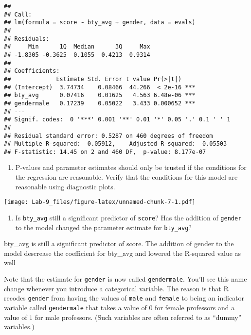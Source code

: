 \documentclass[
]{article}
\newenvironment{Shaded}{\begin{snugshade}}{\end{snugshade}}
\newcommand{\FunctionTok}[1]{\textcolor[rgb]{0.00,0.00,0.00}{#1}}
\newcommand{\NormalTok}[1]{#1}
\newcommand{\SpecialCharTok}[1]{\textcolor[rgb]{0.00,0.00,0.00}{#1}}
\providecommand{\tightlist}{%
  \setlength{\itemsep}{0pt}\setlength{\parskip}{0pt}}
\begin{document}
\begin{verbatim}
## 
## Call:
## lm(formula = score ~ bty_avg + gender, data = evals)
## 
## Residuals:
##     Min      1Q  Median      3Q     Max 
## -1.8305 -0.3625  0.1055  0.4213  0.9314 
## 
## Coefficients:
##             Estimate Std. Error t value Pr(>|t|)    
## (Intercept)  3.74734    0.08466  44.266  < 2e-16 ***
## bty_avg      0.07416    0.01625   4.563 6.48e-06 ***
## gendermale   0.17239    0.05022   3.433 0.000652 ***
## ---
## Signif. codes:  0 '***' 0.001 '**' 0.01 '*' 0.05 '.' 0.1 ' ' 1
## 
## Residual standard error: 0.5287 on 460 degrees of freedom
## Multiple R-squared:  0.05912,    Adjusted R-squared:  0.05503 
## F-statistic: 14.45 on 2 and 460 DF,  p-value: 8.177e-07
\end{verbatim}

\begin{enumerate}
\def\labelenumi{\arabic{enumi}.}
\setcounter{enumi}{6}
\tightlist
\item
  P-values and parameter estimates should only be trusted if the
  conditions for the regression are reasonable. Verify that the
  conditions for this model are reasonable using diagnostic plots.
\end{enumerate}

\begin{Shaded}
\end{Shaded}

\texttt{[image: Lab-9\_files/figure-latex/unnamed-chunk-7-1.pdf]}

\begin{enumerate}
\def\labelenumi{\arabic{enumi}.}
\setcounter{enumi}{7}
\tightlist
\item
  Is \texttt{bty\_avg} still a significant predictor of \texttt{score}?
  Has the addition of \texttt{gender} to the model changed the parameter
  estimate for \texttt{bty\_avg}?
\end{enumerate}

bty\_avg is still a significant predictor of score. The addition of
gender to the model descrease the coefficient for bty\_avg and lowered
the R-squared value as well

Note that the estimate for \texttt{gender} is now called
\texttt{gendermale}. You'll see this name change whenever you introduce
a categorical variable. The reason is that R recodes \texttt{gender}
from having the values of \texttt{male} and \texttt{female} to being an
indicator variable called \texttt{gendermale} that takes a value of
\(0\) for female professors and a value of \(1\) for male professors.
(Such variables are often referred to as ``dummy'' variables.)
\end{document}
